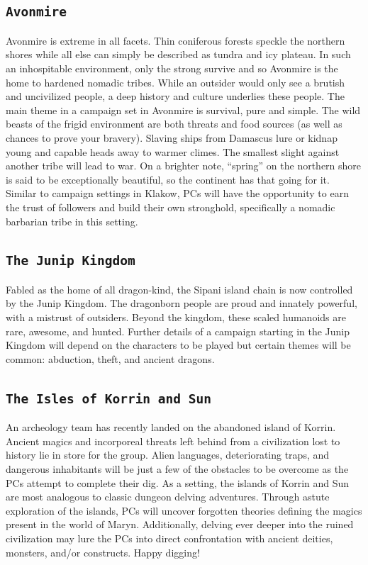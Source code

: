 \documentclass[12pt]{article}
\begin{document}
\subsection*{\texttt{Avonmire}} 
\textsf{Avonmire is extreme in all facets. Thin coniferous forests speckle the northern shores while all else can simply be described as tundra and icy plateau. In such an inhospitable environment, only the strong survive and so Avonmire is the home to hardened nomadic tribes. While an outsider would only see a brutish and uncivilized people, a deep history and culture underlies these people. The main theme in a campaign set in Avonmire is survival, pure and simple. The wild beasts of the frigid environment are both threats and food sources (as well as chances to prove your bravery). Slaving ships from Damascus lure or kidnap young and capable heads away to warmer climes. The smallest slight against another tribe will lead to war. On a brighter note, ``spring'' on the northern shore is said to be exceptionally beautiful, so the continent has that going for it. Similar to campaign settings in Klakow, PCs will have the opportunity to earn the trust of followers and build their own stronghold, specifically a nomadic barbarian tribe in this setting.}

\subsection*{\texttt{The Junip Kingdom}} 
\textsf{Fabled as the home of all dragon-kind, the Sipani island chain is now controlled by the Junip Kingdom. The dragonborn people are proud and innately powerful, with a mistrust of outsiders. Beyond the kingdom, these scaled humanoids are rare, awesome, and hunted. Further details of a campaign starting in the Junip Kingdom will depend on the characters to be played but certain themes will be common: abduction, theft, and ancient dragons.}

\subsection*{\texttt{The Isles of Korrin and Sun}} 
\textsf{An archeology team has recently landed on the abandoned island of Korrin. Ancient magics and incorporeal threats left behind from a civilization lost to history lie in store for the group. Alien languages, deteriorating traps, and dangerous inhabitants will be just a few of the obstacles to be overcome as the PCs attempt to complete their dig. As a setting, the islands of Korrin and Sun are most analogous to classic dungeon delving adventures. Through astute exploration of the islands, PCs will uncover forgotten theories defining the magics present in the world of Maryn. Additionally, delving ever deeper into the ruined civilization may lure the PCs into direct confrontation with ancient deities, monsters, and/or constructs. Happy digging!}
\end{document}
